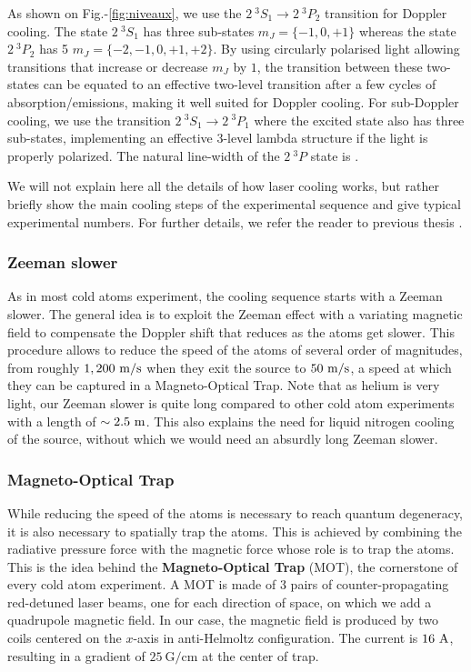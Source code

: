 As shown on Fig.-\ref{fig:niveaux}, we use the $2 \ ^3 S_1 \rightarrow 2 \ ^3 P_2$ transition for Doppler cooling. The state $2 \ ^3 S_1$ has three sub-states $m_J=\{-1,0,+1\}$ whereas the state $2 \ ^3 P_2$ has 5 $m_J=\{-2,-1,0,+1,+2\}$. By using circularly polarised light allowing transitions that increase or decrease $m_J$ by $1$, the transition between these two-states can be equated to an effective two-level transition after a few cycles of absorption/emissions, making it well suited for Doppler cooling. For sub-Doppler cooling, we use the transition  $2 \ ^3 S_1 \rightarrow 2 \ ^3 P_1$ where the excited state also has three sub-states, implementing an effective 3-level lambda structure if the light is properly polarized. The natural line-width of the $2 \ ^3 P$ state is .

We will not explain here all the details of how laser cooling works, but rather briefly show the main cooling steps of the experimental sequence and give typical experimental numbers. For further details, we refer the reader to previous thesis \cite{bouton_these,cayla_these,hoend2014}.



\subsubsection{Zeeman slower}

As in most cold atoms experiment, the cooling sequence starts with a Zeeman slower. The general idea is to exploit the Zeeman effect with a variating magnetic field to compensate the Doppler shift that reduces as the atoms get slower. This procedure allows to reduce the speed of the atoms of several order of magnitudes, from roughly $1,200 \ \rm{m/s}$ when they exit the source to $50 \ \rm{m/s}$, a speed at which they can be captured in a Magneto-Optical Trap. Note that as helium is very light, our Zeeman slower is quite long compared to other cold atom experiments with a length of $\sim 2.5 \ \rm{m}$. This also explains the need for liquid nitrogen cooling of the source, without which we would need an absurdly long Zeeman slower.

\subsubsection{Magneto-Optical Trap}

While reducing the speed of the atoms is necessary to reach quantum degeneracy, it is also necessary to spatially trap the atoms. This is achieved by combining the radiative pressure force with the magnetic force whose role is to trap the atoms. This is the idea behind the \textbf{Magneto-Optical Trap} (MOT), the cornerstone of every cold atom experiment. A MOT is made of 3 pairs of counter-propagating red-detuned laser beams, one for each direction of space, on which we add a quadrupole magnetic field. In our case, the magnetic field is produced by two coils centered on the $x$-axis in anti-Helmoltz configuration. The current is $16 \ \rm{A}$, resulting in a gradient of $25 \ \mathrm{G/cm}$ at the center of trap.

